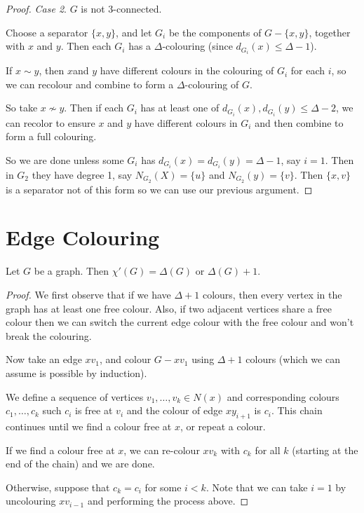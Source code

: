 \documentclass[a3paper, 10pt]{article}
\begin{document}
\begin{multicols*}{5}
\begin{proof}
    \emph{Case 2}. $G$ is not 3-connected.

    Choose a separator $\{x, y\}$, and let $G_i$ be the components of $G - \{x, y\}$, together with $x$ and $y$. Then each $G_i$ has a $\Delta$-colouring (since $d_{G_i}(x) \leq \Delta - 1$).

    If $x \sim y$, then $x$and $y$ have different colours in the colouring of $G_i$ for each $i$, so we can recolour and combine to form a $\Delta$-colouring of $G$.
    
    So take $x \not \sim y$. Then if each $G_i$ has at least one of $d_{G_i}(x), d_{G_i}(y) \leq \Delta - 2$, we can recolor to ensure $x$ and $y$ have different colours in $G_i$ and then combine to form a full colouring.

So we are done unless some $G_i$ has $d_{G_i}(x) = d_{G_i}(y) = \Delta - 1$, say $i = 1$. Then in $G_2$ they have degree 1, say $N_{G_2}(X) = \{u\}$ and $N_{G_2}(y) = \{v\}$. Then $\{x, v\}$ is a separator not of this form so we can use our previous argument.
\end{proof}

\section{Edge Colouring}

\begin{theorem}[Vizing]
    Let $G$ be a graph. Then $\chi'(G) = \Delta(G)$ or $\Delta(G) + 1$.
\end{theorem}
\begin{proof}
    We first observe that if we have $\Delta + 1$ colours, then every vertex in the graph has at least one free colour. Also, if two adjacent vertices share a free colour then we can switch the current edge colour with the free colour and won't break the colouring.

    Now take an edge $x v_1$, and colour $G - x v_1$ using $\Delta + 1$ colours (which we can assume is possible by induction).

    We define a sequence of vertices $v_1, \dots, v_k \in N(x)$ and corresponding colours $c_1, \dots, c_k$ such $c_i$ is free at $v_i$ and the colour of edge $x y_{i + 1}$ is $c_i$. This chain continues until we find a colour free at $x$, or repeat a colour.
    
    If we find a colour free at $x$, we can re-colour $x v_k$ with $c_k$ for all $k$ (starting at the end of the chain) and we are done. 

    Otherwise, suppose that $c_k = c_i$ for some $i < k$. Note that we can take $i = 1$ by uncolouring $xv_{i - 1}$ and performing the process above.
    

\end{proof}
\end{multicols*}
\end{document}
